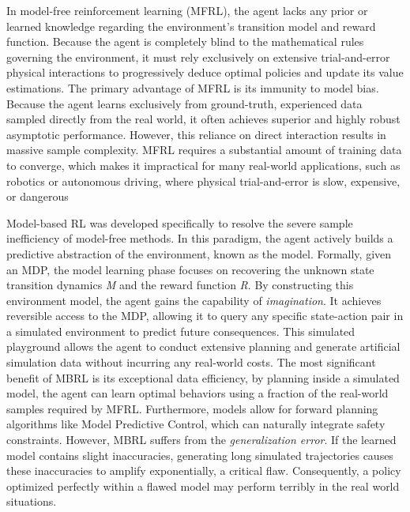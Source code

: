 In model-free reinforcement learning (MFRL), the agent lacks any prior or learned knowledge regarding the environment's transition model and reward function. Because the agent is completely blind to the mathematical rules governing the environment, it must rely exclusively on extensive trial-and-error physical interactions to progressively deduce optimal policies and update its value estimations. The primary advantage of MFRL is its immunity to model bias. Because the agent learns exclusively from ground-truth, experienced data sampled directly from the real world, it often achieves superior and highly robust asymptotic performance. However, this reliance on direct interaction results in massive sample complexity. MFRL requires a substantial amount of training data to converge, which makes it impractical for many real-world applications, such as robotics or autonomous driving, where physical trial-and-error is slow, expensive, or dangerous
\cite{NaeemMuddasar2020AGIt} 
\cite{moerland2022modelbasedreinforcementlearningsurvey} %


Model-based RL was developed specifically to resolve the severe sample inefficiency of model-free methods. In this paradigm, the agent actively builds a predictive abstraction of the environment, known as the model. Formally, given an MDP, the model learning phase focuses on recovering the unknown state transition dynamics \textit{M} and the reward function \textit{R}. By constructing this environment model, the agent gains the capability of \textit{imagination}. It achieves reversible access to the MDP, allowing it to query any specific state-action pair in a simulated environment to predict future consequences. This simulated playground allows the agent to conduct extensive planning and generate artificial simulation data without incurring any real-world costs. The most significant benefit of MBRL is its exceptional data efficiency, by planning inside a simulated model, the agent can learn optimal behaviors using a fraction of the real-world samples required by MFRL. Furthermore, models allow for forward planning algorithms like Model Predictive Control, which can naturally integrate safety constraints. However, MBRL suffers from the \textit{generalization error}. If the learned model contains slight inaccuracies, generating long simulated trajectories causes these inaccuracies to amplify exponentially, a critical flaw. Consequently, a policy optimized perfectly within a flawed model may perform terribly in the real world situations. \cite{moerland2022modelbasedreinforcementlearningsurvey} %


